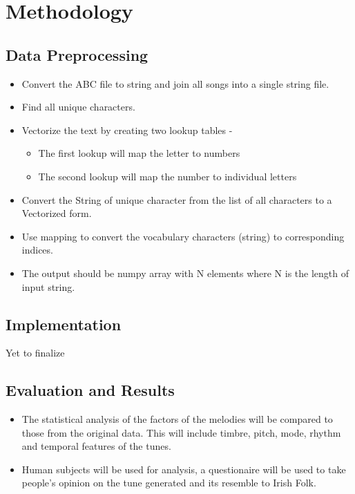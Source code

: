 \documentclass[oneside,12pt]{Classes/RoboticsLaTeX}
\begin{document}
\chapter{Methodology}
\label{chap:methodology}

\section{Data Preprocessing}

\begin{itemize}
  \item Convert the ABC file to string and join all songs into a single string file.
  \item Find all unique characters.
  \item Vectorize the text by creating two lookup tables - 
  \begin{itemize}
    \item The first lookup will map the letter to numbers 
    \item The second lookup will map the number to individual letters
  \end{itemize}
  \item Convert the String of unique character from the list of all characters to a Vectorized form.
  \item Use mapping to convert the vocabulary characters (string) to corresponding indices.
  \item The output should be numpy array with N elements where N is the length of input string.
\end{itemize}

\section{Implementation}

Yet to finalize

\section{Evaluation and Results}

\begin{itemize}
  \item The statistical analysis of the factors of the melodies will be compared to those from the original data. This will include timbre, pitch, mode, rhythm and temporal features of the tunes.
  \item Human subjects will be used for analysis, a questionaire will be used to take people's opinion on the tune generated and its resemble to Irish Folk.
\end{itemize}
\renewcommand{\bibname}{References}           %



\end{document}
